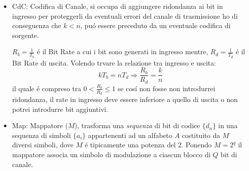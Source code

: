     \begin{itemize}
        \item {CdC: Codifica di Canale, si occupa di aggiungere ridondanza ai bit in ingresso per proteggerli da eventuali errori del canale di trasmissione ho di
            conseguenza che $k<n$, puó essere preceduto da un eventuale codifica di sorgente. 
            \begin{figure}[H]
                \centering 
            \end{figure}
            $R_b = \frac{1}{T_b}$ é il Bit Rate a cui i bit sono generati in ingresso mentre, $R_d = \frac{1}{T_d}$ é il Bit Rate di uscita. Volendo trvare la relazione tra ingresso e uscita:
            \[
                kT_b = nT_d \Rightarrow \frac{R_b}{R_d} = \frac{k}{n}     
            \] 
            il quale é compreso tra $0<\frac{R_b}{R_d}\leq 1$ se cosí non fosse non introdurrei ridondanza, il rate in ingresso deve essere inferiore a quello di uscita o non 
            potrei introdurre bit aggiuntivi.
        }
        \item {Map: Mappatore ($M$), trasforma una \emph{sequenza} di bit di codice $\{d_n\}$ in una sequenza di simboli $\{a_i\}$ appartenenti ad un alfabeto $A$ costituito
            da $M$ diversi simboli, dove $M$ é tipicamente una potenza del $2$. Ponendo $M=2^q$ il mappatore associa un simbolo di modulazione a ciascun blocco di $Q$ bit di canale. 
            \begin{figure}[H]
                \centering 
                \begin{tikzpicture}[
                    node distance=3cm,
                    >=latex
                    ]
        

\end{tikzpicture}
\end{figure}}
\end{itemize}
